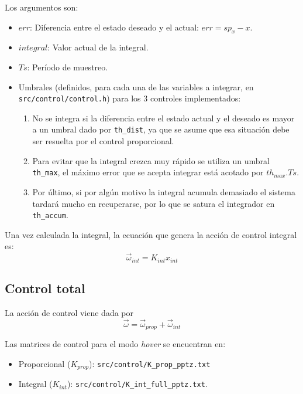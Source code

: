 \documentclass[main]{subfiles}
\begin{document}
Los argumentos son:
\begin{itemize}
\item $err$: Diferencia entre el estado deseado y el actual: $err = sp_{x} - x$.
\item $integral$: Valor actual de la integral.
\item $Ts$: Per\'iodo de muestreo.
\item Umbrales (definidos, para cada una de las variables a integrar, en \newline\verb+src/control/control.h+) para los 3 controles implementados:
  \begin{enumerate}
  \item No se integra si la diferencia entre el estado actual y el deseado es mayor a un umbral dado por \verb+th_dist+, ya que se asume que esa situaci\'on debe ser resuelta por el control proporcional.
  \item Para evitar que la integral crezca muy r\'apido se utiliza un umbral \verb+th_max+, el m\'aximo error que se acepta integrar est\'a acotado por $th_{max}.Ts$.
  \item Por \'ultimo, si por alg\'un motivo la integral acumula demasiado el sistema tardar\'a mucho en recuperarse, por lo que se satura el integrador en \verb+th_accum+.
\end{enumerate}
\end{itemize}

Una vez calculada la integral, la ecuaci\'on que genera la acci\'on de control integral es:
\begin{equation}
  \label{eq:software:int}
  \vec{\omega}_{int} = K_{int} x_{int}
\end{equation}

\subsection{Control total}
\label{sec:software:control-total}

La acci\'on de control viene dada por
\begin{equation}
  \label{eq:software:control}
  \vec{\omega} = \vec{\omega}_{prop} + \vec{\omega}_{int}
\end{equation}

Las matrices de control para el modo \textit{hover} se encuentran en:
\begin{itemize}
\item Proporcional ($K_{prop}$): \verb+src/control/K_prop_pptz.txt+
\item Integral ($K_{int}$): \verb+src/control/K_int_full_pptz.txt+.
\end{itemize}
\end{document}
